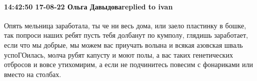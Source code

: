  
 
 
 
 

\paragraph{14:42:50 17-08-22 Ольга Давыдоваreplied to ivan}

Опять мельница заработала, ты че ни весь дома, или заело пластинку в бошке, так
попроси наших ребят пусть тебя долбанут по кумполу, глядишь заработает, если
что мы добрые, мы можем вас приучать волына и всякая азовская шваль
успоГОилась, молча рубят капусту и моют полы, а вас таких генетических отбросов
и вовсе утихомирим, а если не подчинитесь повесим с фонариками или вместо на
столбах.

